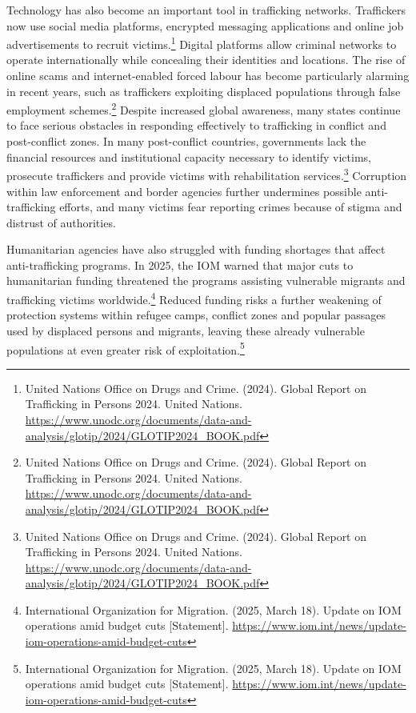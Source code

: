 Technology has also become an important tool in trafficking networks. Traffickers now use social media platforms, encrypted messaging applications and online job advertisements to recruit victims.\footnote{United Nations Office on Drugs and Crime. (2024). Global Report on Trafficking in Persons 2024. United Nations. \url{https://www.unodc.org/documents/data-and-analysis/glotip/2024/GLOTIP2024_BOOK.pdf}} Digital platforms allow criminal networks to operate internationally while concealing their identities and locations. The rise of online scams and internet-enabled forced labour has become particularly alarming in recent years, such as traffickers exploiting displaced populations through false employment schemes.\footnote{United Nations Office on Drugs and Crime. (2024). Global Report on Trafficking in Persons 2024. United Nations. \url{https://www.unodc.org/documents/data-and-analysis/glotip/2024/GLOTIP2024_BOOK.pdf}} Despite increased global awareness, many states continue to face serious obstacles in responding effectively to trafficking in conflict and post-conflict zones. In many post-conflict countries, governments lack the financial resources and institutional capacity necessary to identify victims, prosecute traffickers and provide victims with rehabilitation services.\footnote{United Nations Office on Drugs and Crime. (2024). Global Report on Trafficking in Persons 2024. United Nations. \url{https://www.unodc.org/documents/data-and-analysis/glotip/2024/GLOTIP2024_BOOK.pdf}} Corruption within law enforcement and border agencies further undermines possible anti-trafficking efforts, and many victims fear reporting crimes because of stigma and distrust of authorities.

Humanitarian agencies have also struggled with funding shortages that affect anti-trafficking programs. In 2025, the IOM warned that major cuts to humanitarian funding threatened the programs assisting vulnerable migrants and trafficking victims worldwide.\footnote{International Organization for Migration. (2025, March 18). Update on IOM operations amid budget cuts [Statement]. \url{https://www.iom.int/news/update-iom-operations-amid-budget-cuts}} Reduced funding risks a further weakening of protection systems within refugee camps, conflict zones and popular passages used by displaced persons and migrants, leaving these already vulnerable populations at even greater risk of exploitation.\footnote{International Organization for Migration. (2025, March 18). Update on IOM operations amid budget cuts [Statement]. \url{https://www.iom.int/news/update-iom-operations-amid-budget-cuts}}

